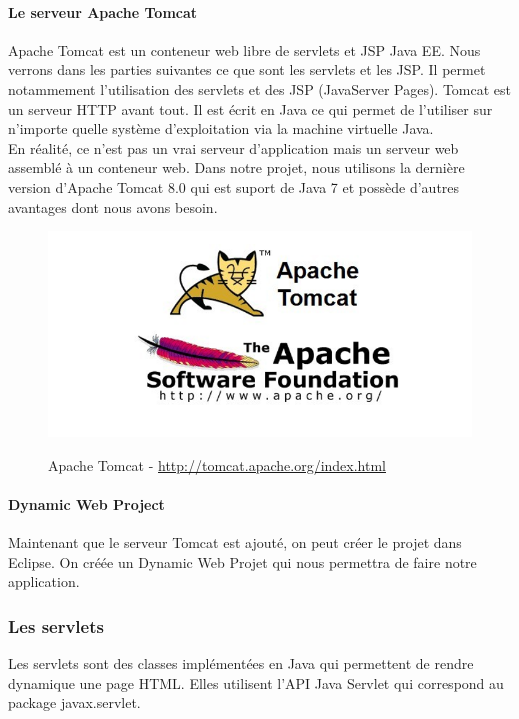 \paragraph{Le serveur Apache Tomcat}
Apache Tomcat est un conteneur web libre de servlets et JSP Java EE. Nous verrons dans les parties suivantes ce que sont les servlets et les JSP. Il permet notammement l'utilisation des servlets et des JSP (JavaServer Pages).
Tomcat est un serveur HTTP avant tout. Il est écrit en Java ce qui permet de l'utiliser sur n'importe quelle système d'exploitation via la machine virtuelle Java.\\
En réalité, ce n'est pas un vrai serveur d'application mais un serveur web assemblé à un conteneur web. Dans notre projet, nous utilisons la dernière version d'Apache Tomcat 8.0 qui est suport de Java 7 et possède d'autres avantages dont nous avons besoin.\\
\begin{figure}[H]
  \center
  \includegraphics[scale=0.3]{../graph/apache.png} \\
  \caption{Apache Tomcat - \url{http://tomcat.apache.org/index.html}}
\end{figure}


\paragraph{Dynamic Web Project}
Maintenant que le serveur Tomcat est ajouté, on peut créer le projet dans Eclipse. On créée un Dynamic Web Projet qui nous permettra de faire notre application.




\subsubsection{Les servlets}
Les servlets sont des classes implémentées en Java qui permettent de rendre
dynamique une page HTML. Elles utilisent l'API Java Servlet qui correspond au
package javax.servlet.\\

